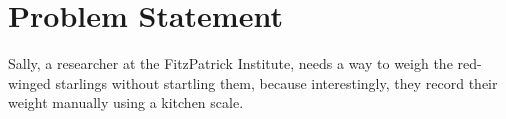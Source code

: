 \documentclass[class=report,11pt,crop=false]{standalone}
\begin{document}
	\chapter{Problem Statement \label{ch:problem}}
	\vspace{0.5cm}
	Sally, a researcher at the FitzPatrick Institute, needs a way to weigh the red-winged starlings without startling them, because interestingly, they record their weight manually using a kitchen scale.
	
	\ifstandalone
	
	\printnoidxglossary[type=\acronymtype,nonumberlist]
	\fi
\end{document}
